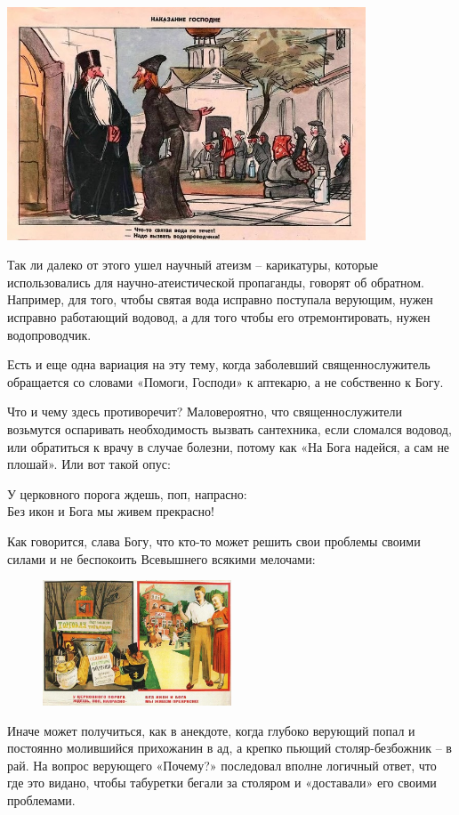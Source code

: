 \begin{center}
    \includegraphics[width=0.8\textwidth]{img/holy-water.jpg}
\end{center}

Так ли далеко от этого ушел научный атеизм – карикатуры, которые использовались для научно-атеистической пропаганды, говорят об обратном. Например, для того, чтобы святая вода исправно поступала верующим, нужен исправно работающий водовод, а для того чтобы его отремонтировать, нужен водопроводчик.



Есть и еще одна вариация на эту тему, когда заболевший священнослужитель обращается со словами «Помоги, Господи» к аптекарю, а не собственно к Богу.

Что и чему здесь противоречит? Маловероятно, что священнослужители возьмутся оспаривать необходимость вызвать сантехника, если сломался водовод, или обратиться к врачу в случае болезни, потому как «На Бога надейся, а сам не плошай». Или вот такой опус:

\begin{fancyquotes}
    У церковного порога ждешь, поп, напрасно:\\
    Без икон и Бога мы живем прекрасно!
\end{fancyquotes}

Как говорится, слава Богу, что кто-то может решить свои проблемы своими силами и не беспокоить Всевышнего всякими мелочами:

\begin{figure}
    \includegraphics[width=0.5\textwidth]{img/atheism-church.jpg}
\end{figure}
Иначе может получиться, как в анекдоте, когда глубоко верующий попал и постоянно молившийся прихожанин в ад, а крепко пьющий столяр-безбожник – в рай. На вопрос верующего «Почему?» последовал вполне логичный ответ, что где это видано, чтобы табуретки бегали за столяром и «доставали» его своими проблемами.

